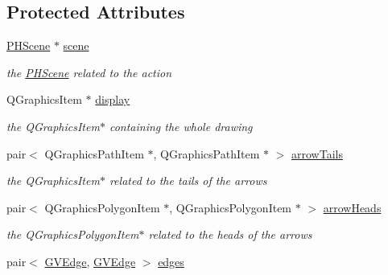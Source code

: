 \subsection*{\-Protected \-Attributes}
\begin{DoxyCompactItemize}
\item 
\hypertarget{class_g_action_a5318deb6935859f5d2ebd1836ec6eb85}{\hyperlink{class_p_h_scene}{\-P\-H\-Scene} $\ast$ \hyperlink{class_g_action_a5318deb6935859f5d2ebd1836ec6eb85}{scene}}\label{class_g_action_a5318deb6935859f5d2ebd1836ec6eb85}

\begin{DoxyCompactList}\small\item\em the \hyperlink{class_p_h_scene}{\-P\-H\-Scene} related to the action \end{DoxyCompactList}\item 
\hypertarget{class_g_action_a80fd22faf283374dd9861bf4900eafa4}{\-Q\-Graphics\-Item $\ast$ \hyperlink{class_g_action_a80fd22faf283374dd9861bf4900eafa4}{display}}\label{class_g_action_a80fd22faf283374dd9861bf4900eafa4}

\begin{DoxyCompactList}\small\item\em the \-Q\-Graphics\-Item$\ast$ containing the whole drawing \end{DoxyCompactList}\item 
\hypertarget{class_g_action_abc626fc7dc52a5f02960706c02a52db9}{pair$<$ \-Q\-Graphics\-Path\-Item \*
$\ast$, \-Q\-Graphics\-Path\-Item $\ast$ $>$ \hyperlink{class_g_action_abc626fc7dc52a5f02960706c02a52db9}{arrow\-Tails}}\label{class_g_action_abc626fc7dc52a5f02960706c02a52db9}

\begin{DoxyCompactList}\small\item\em the \-Q\-Graphics\-Item$\ast$ related to the tails of the arrows \end{DoxyCompactList}\item 
\hypertarget{class_g_action_aab9cc72a8692e0b15f19e192ab21d609}{pair$<$ \-Q\-Graphics\-Polygon\-Item \*
$\ast$, \-Q\-Graphics\-Polygon\-Item $\ast$ $>$ \hyperlink{class_g_action_aab9cc72a8692e0b15f19e192ab21d609}{arrow\-Heads}}\label{class_g_action_aab9cc72a8692e0b15f19e192ab21d609}

\begin{DoxyCompactList}\small\item\em the \-Q\-Graphics\-Polygon\-Item$\ast$ related to the heads of the arrows \end{DoxyCompactList}\item 
\hypertarget{class_g_action_a65f9f4938e024adc07cea387079549f8}{pair$<$ \hyperlink{struct_g_v_edge}{\-G\-V\-Edge}, \hyperlink{struct_g_v_edge}{\-G\-V\-Edge} $>$ \hyperlink{class_g_action_a65f9f4938e024adc07cea387079549f8}{edges}}\label{class_g_action_a65f9f4938e024adc07cea387079549f8}


\end{DoxyCompactItemize}
